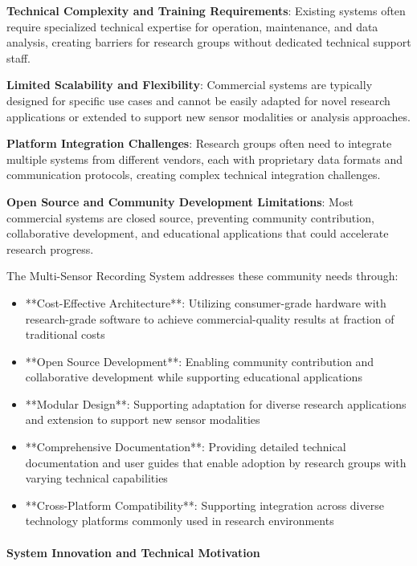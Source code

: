 \documentclass[12pt,a4paper]{report}
\begin{document}
\textbf{Technical Complexity and Training Requirements}: Existing systems often require specialized technical expertise for
operation, maintenance, and data analysis, creating barriers for research groups without dedicated technical support
staff.

\textbf{Limited Scalability and Flexibility}: Commercial systems are typically designed for specific use cases and cannot be
easily adapted for novel research applications or extended to support new sensor modalities or analysis approaches.

\textbf{Platform Integration Challenges}: Research groups often need to integrate multiple systems from different vendors,
each with proprietary data formats and communication protocols, creating complex technical integration challenges.

\textbf{Open Source and Community Development Limitations}: Most commercial systems are closed source, preventing community
contribution, collaborative development, and educational applications that could accelerate research progress.

The Multi-Sensor Recording System addresses these community needs through:

\begin{itemize}
\item **Cost-Effective Architecture**: Utilizing consumer-grade hardware with research-grade software to achieve
  commercial-quality results at fraction of traditional costs
\item **Open Source Development**: Enabling community contribution and collaborative development while supporting
  educational applications
\item **Modular Design**: Supporting adaptation for diverse research applications and extension to support new sensor
  modalities
\item **Comprehensive Documentation**: Providing detailed technical documentation and user guides that enable adoption by
  research groups with varying technical capabilities
\item **Cross-Platform Compatibility**: Supporting integration across diverse technology platforms commonly used in research
  environments

\end{itemize}
\paragraph{System Innovation and Technical Motivation}
\end{document}
